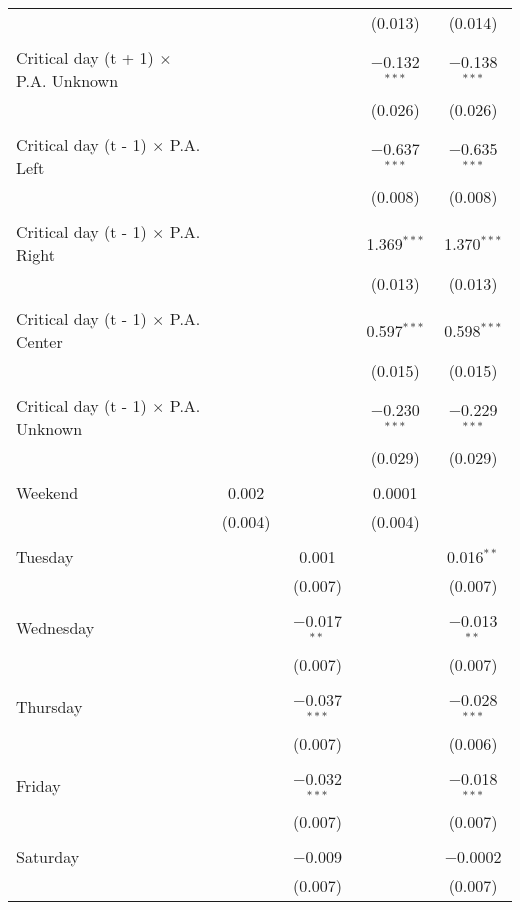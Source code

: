 \documentclass[
]{article}
\begin{document}
\begin{table}[!htbp]
{\begin{tabular}{@{\extracolsep{5pt}}lcccc}
  &  &  & (0.013) & (0.014) \\ 
  & & & & \\ 
 Critical day (t + 1) $\times$ P.A. Unknown &  &  & $-$0.132$^{***}$ & $-$0.138$^{***}$ \\ 
  &  &  & (0.026) & (0.026) \\ 
  & & & & \\ 
 Critical day (t - 1) $\times$ P.A. Left &  &  & $-$0.637$^{***}$ & $-$0.635$^{***}$ \\ 
  &  &  & (0.008) & (0.008) \\ 
  & & & & \\ 
 Critical day (t - 1) $\times$ P.A. Right &  &  & 1.369$^{***}$ & 1.370$^{***}$ \\ 
  &  &  & (0.013) & (0.013) \\ 
  & & & & \\ 
 Critical day (t - 1) $\times$ P.A. Center &  &  & 0.597$^{***}$ & 0.598$^{***}$ \\ 
  &  &  & (0.015) & (0.015) \\ 
  & & & & \\ 
 Critical day (t - 1) $\times$ P.A. Unknown &  &  & $-$0.230$^{***}$ & $-$0.229$^{***}$ \\ 
  &  &  & (0.029) & (0.029) \\ 
  & & & & \\ 
 Weekend & 0.002 &  & 0.0001 &  \\ 
  & (0.004) &  & (0.004) &  \\ 
  & & & & \\ 
 Tuesday &  & 0.001 &  & 0.016$^{**}$ \\ 
  &  & (0.007) &  & (0.007) \\ 
  & & & & \\ 
 Wednesday &  & $-$0.017$^{**}$ &  & $-$0.013$^{**}$ \\ 
  &  & (0.007) &  & (0.007) \\ 
  & & & & \\ 
 Thursday &  & $-$0.037$^{***}$ &  & $-$0.028$^{***}$ \\ 
  &  & (0.007) &  & (0.006) \\ 
  & & & & \\ 
 Friday &  & $-$0.032$^{***}$ &  & $-$0.018$^{***}$ \\ 
  &  & (0.007) &  & (0.007) \\ 
  & & & & \\ 
 Saturday &  & $-$0.009 &  & $-$0.0002 \\ 
  &  & (0.007) &  & (0.007) \\ 

\end{tabular}}
\end{table}
\end{document}
